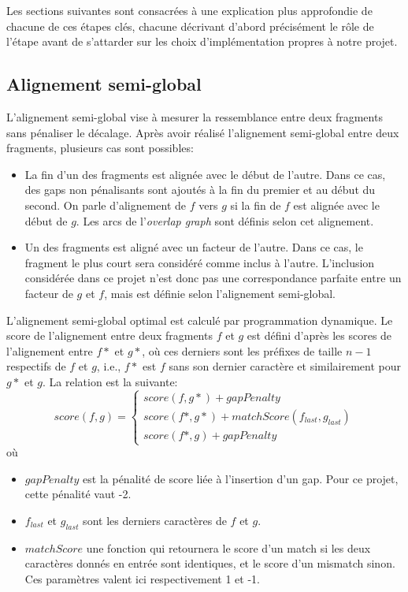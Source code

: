\documentclass{article}
\begin{document}
Les sections suivantes sont consacrées à une explication plus approfondie de chacune de ces étapes clés, chacune décrivant d'abord précisément le rôle de l'étape avant de s'attarder sur les choix d'implémentation propres à notre projet.

\subsection{Alignement semi-global}

L'alignement semi-global vise à mesurer la ressemblance entre deux fragments sans pénaliser le décalage.
Après avoir réalisé l'alignement semi-global entre deux fragments, plusieurs cas sont possibles:
\begin{itemize}
\item La fin d'un des fragments est alignée avec le début de l'autre. Dans ce cas, des gaps non pénalisants sont ajoutés à la fin du premier et au début du second. On parle d'alignement de $f$ vers $g$ si la fin de $f$ est alignée avec le début de $g$. Les arcs de l'\textit{overlap graph} sont définis selon cet alignement.
\item Un des fragments est aligné avec un facteur de l'autre. Dans ce cas, le fragment le plus court sera considéré comme inclus à l'autre. L'inclusion considérée dans ce projet n'est donc pas une correspondance parfaite entre un facteur de $g$ et $f$, mais est définie selon l'alignement semi-global.
\end{itemize}

L'alignement semi-global optimal est calculé par programmation dynamique. 
Le score de l'alignement entre deux fragments $f$ et $g$ est défini d'après les scores de l'alignement entre $f*$ et $g*$, où ces derniers sont les préfixes de taille $n-1$ respectifs de $f$ et $g$, i.e., $f*$ est $f$ sans son dernier caractère et similairement pour $g*$ et $g$.
La relation est la suivante:
$$score(f, g) = 
 \left\{
    \begin{array}{ll}
        score(f,g*)+gapPenalty \\
        score(f*,g*)+matchScore(f_{last}, g_{last})\\
        score(f*,g)+gapPenalty
    \end{array}
\right.$$
où 
\begin{itemize}
\item $gapPenalty$ est la pénalité de score liée à l'insertion d'un gap. Pour ce projet, cette pénalité vaut -2.
\item $f_{last}$ et $g_{last}$ sont les derniers caractères de $f$ et $g$.
\item $matchScore$ une fonction qui retournera le score d'un match si les deux caractères donnés en entrée sont identiques, et le score d'un mismatch sinon. Ces paramètres valent ici respectivement 1 et -1.
\end{itemize} 
\end{document}

